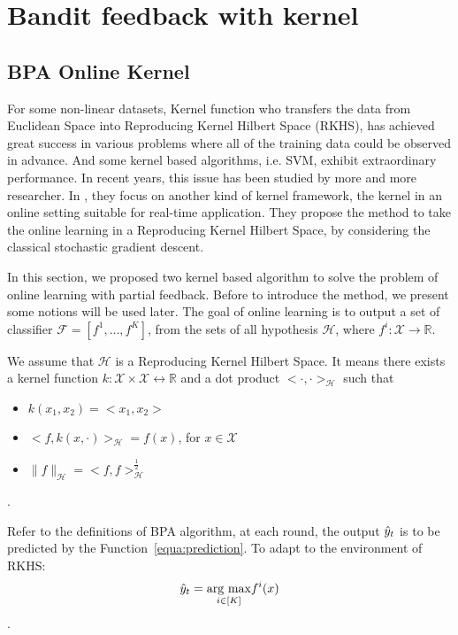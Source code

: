 \section{Bandit feedback with kernel}
\label{subsec:KBF}

\subsection{BPA Online Kernel}

For some non-linear datasets, Kernel function who transfers the data from Euclidean Space into Reproducing Kernel Hilbert Space (RKHS), has achieved great success in various problems where all of the training data could be observed in advance. And some kernel based algorithms, i.e. SVM, exhibit extraordinary performance. In recent years, this issue has been studied by more and more researcher. In \cite{kivinen2004online,schuurmans2007implicit,slavakis2008online}, they 
focus on another kind of kernel framework, the kernel in an online setting suitable for real-time application. They propose the method to take the online learning in a Reproducing Kernel Hilbert Space, by considering the classical stochastic gradient descent.

In this section, we proposed two kernel based algorithm to solve the problem of online learning with partial feedback. Before to introduce the method, we present some notions will be used later. The goal of online learning is to output a set of classifier $\mathscr{F} = [f^1,\dots,f^K]$, from the sets of all hypothesis $\mathscr{H}$, where $ f^i: \mathscr{X} \rightarrow \mathbb{R}$. 

We assume that  $\mathscr{H}$ is a Reproducing Kernel Hilbert Space. It means there exists a kernel function $ k: \mathscr{X}\times \mathscr{X} \leftrightarrow \mathbb{R}$ and a dot product $<\cdot,\cdot>_{\mathscr{H}}$ such that 
\begin{itemize}
\item	$k(x_1,x_2) = <x_1,x_2>$
\item	$<f, k(x,\cdot)>_{\mathscr{H}} = f(x)$, for $x\in\mathscr{X}$
\item	$\parallel{f}\parallel_{\mathscr{H}} = <f,f>_{\mathscr{H}}^{\frac{1}{2}}$
\end{itemize}.

Refer to the definitions of BPA algorithm, at each round, the output $\hat{y}_t$ is to be predicted by the Function~\ref{equa:prediction}. To adapt to the environment of RKHS:
\[\hat{y}_t = \underset{i\in [K]}{\text{arg max}} f^i(x)\].

